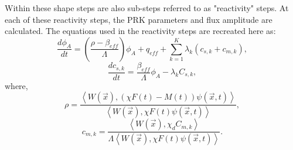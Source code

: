 Within these shape steps are also sub-steps referred to as "reactivity" steps.
At each of these reactivity steps, the \gls{PRK} parameters and flux amplitude are calculated.
The equations used in the reactivity steps are recreated here as:
\begin{equation}
    \frac{d \phi_A}{dt} = \left( \frac{\rho - \beta_{eff}}{\Lambda} \right) \phi_A + q_{eff} + \sum_{k=1}^K \lambda_k \left( c_{s, k} + c_{m, k} \right),
    \label{eq:rineiski-n}
\end{equation}
\begin{equation}
    \frac{dc_{s, k}}{dt} = \frac{\beta_{eff}}{\Lambda} \phi_A - \lambda_k C_{s, k},
    \label{eq:rineiski-cs}
\end{equation}
where,
\begin{equation}
    \rho = \frac{\left\langle W(\vec{x}), \left(\chi F(t) - M(t)\right) \psi  (\vec{x}, t) \right\rangle}{\left\langle W(\vec{x}), \chi F(t) \psi  (\vec{x}, t) \right\rangle},
    \label{eq:rineiski-rho}
\end{equation}
\begin{equation}
    c_{m, k} = \frac{\left\langle W(\vec{x}), \chi_d C_{m, k} \right\rangle}{\Lambda \left\langle W(\vec{x}), \chi F(t) \psi  (\vec{x}, t) \right\rangle}.
    \label{eq:rineiski-cm}
\end{equation}

